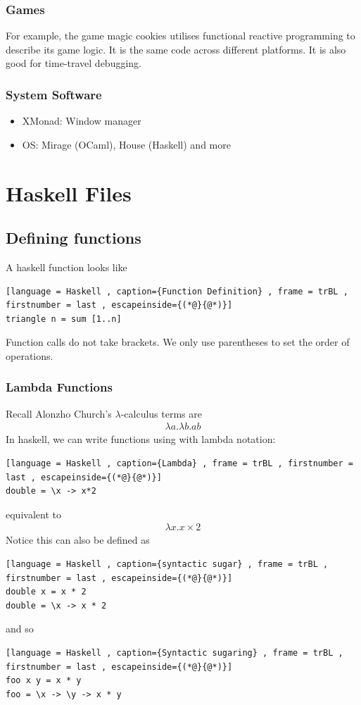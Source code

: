 \documentclass[a4paper]{article}
\theoremstyle{plain}
\theoremstyle{definition}
\theoremstyle{remark}
\begin{document}
\subsubsection{Games}
For example, the game magic cookies utilises functional reactive programming to describe its game logic. It is the same code across different platforms. It is also good for time-travel debugging.
\subsubsection{System Software}
\begin{itemize}
	\item XMonad: Window manager
	\item OS: Mirage (OCaml), House (Haskell) and more
\end{itemize}
\section{Haskell Files}
\subsection{Defining functions}
A haskell function looks like
\begin{lstlisting}[language = Haskell , caption={Function Definition} , frame = trBL , firstnumber = last , escapeinside={(*@}{@*)}]
triangle n = sum [1..n]
\end{lstlisting}
Function calls do not take brackets. We only use parentheses to set the order of operations. 
\subsubsection{Lambda Functions}
Recall Alonzho Church's $\lambda$-calculus terms are
\begin{align*}
	\lambda a. \lambda b. a b
\end{align*}
In haskell, we can write functions using with lambda notation:
\begin{lstlisting}[language = Haskell , caption={Lambda} , frame = trBL , firstnumber = last , escapeinside={(*@}{@*)}]
double = \x -> x*2
\end{lstlisting}
equivalent to
\begin{align*}
	\lambda x . x \times 2
\end{align*}
Notice this can also be defined as
\begin{lstlisting}[language = Haskell , caption={syntactic sugar} , frame = trBL , firstnumber = last , escapeinside={(*@}{@*)}]
double x = x * 2
double = \x -> x * 2
\end{lstlisting}
and so
\begin{lstlisting}[language = Haskell , caption={Syntactic sugaring} , frame = trBL , firstnumber = last , escapeinside={(*@}{@*)}]
foo x y = x * y
foo = \x -> \y -> x * y
\end{lstlisting}
\end{document}
